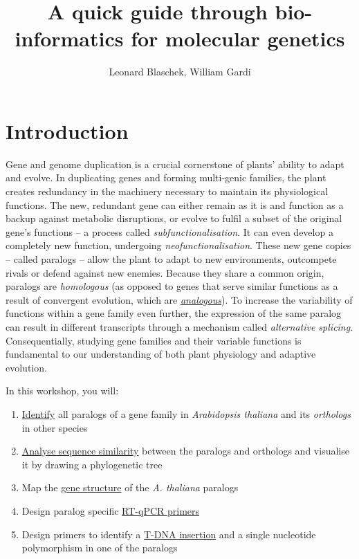 \documentclass[11pt]{article}
\title{A quick guide through bio-informatics for molecular genetics}
\author{Leonard Blaschek, William Gardi}
\begin{document}
 	\maketitle
 	
 	\section*{Introduction}
 	
 	Gene and genome duplication is a crucial cornerstone of plants' ability to adapt and evolve.
 	In duplicating genes and forming multi-genic families, the plant creates redundancy in the machinery necessary to maintain its physiological functions. 
 	The new, redundant gene can either remain as it is and function as a backup against metabolic disruptions, or evolve to fulfil a subset of the original gene's functions --  a process called \textit{subfunctionalisation}.
 	It can even develop a completely new function, undergoing \textit{neofunctionalisation}.
 	These new gene copies -- called paralogs -- allow the plant to adapt to new environments, outcompete rivals or defend against new enemies.
 	Because they share a common origin, paralogs are \textit{homologous} (as opposed to genes that serve similar functions as a result of convergent evolution, which are \href{https://evolution.berkeley.edu/evolibrary/article/evo_09}{\textit{analogous}}).
 	To increase the variability of functions within a gene family even further, the expression of the same paralog can result in different transcripts through a mechanism called \textit{alternative splicing}.
 	Consequentially, studying gene families and their variable functions is fundamental to our understanding of both plant physiology and adaptive evolution.

 	\vspace*{1em}
 	
 	In this workshop, you will:
 	\begin{enumerate}
 		\item \hyperref[sec:find]{Identify} all paralogs of a gene family in \textit{Arabidopsis thaliana} and its \textit{orthologs} in other species
 		\item \hyperref[sec:phylo]{Analyse sequence similarity} between the paralogs and orthologs and visualise it by drawing a phylogenetic tree
 		\item Map the \hyperref[sec:str]{gene structure} of the \textit{A. thaliana} paralogs
 		\item Design paralog specific \hyperref[sec:qpcr]{RT-qPCR primers}
 		\item Design primers to identify a \hyperref[sec:mut]{T-DNA insertion} and a single nucleotide polymorphism in one of the paralogs
 	\end{enumerate}
 	
\end{document}
